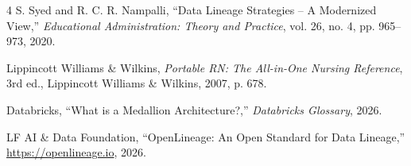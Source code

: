 \documentclass[11pt,a4paper]{article}
\begin{document}
\begin{thebibliography}{4}
S. Syed and R. C. R. Nampalli, ``Data Lineage Strategies -- A Modernized View,'' \textit{Educational Administration: Theory and Practice}, vol. 26, no. 4, pp. 965--973, 2020.

Lippincott Williams \& Wilkins, \textit{Portable RN: The All-in-One Nursing Reference}, 3rd ed., Lippincott Williams \& Wilkins, 2007, p. 678.

Databricks, ``What is a Medallion Architecture?,'' \textit{Databricks Glossary}, 2026.

LF AI \& Data Foundation, ``OpenLineage: An Open Standard for Data Lineage,'' \url{https://openlineage.io}, 2026.
\end{thebibliography}
\end{document}
